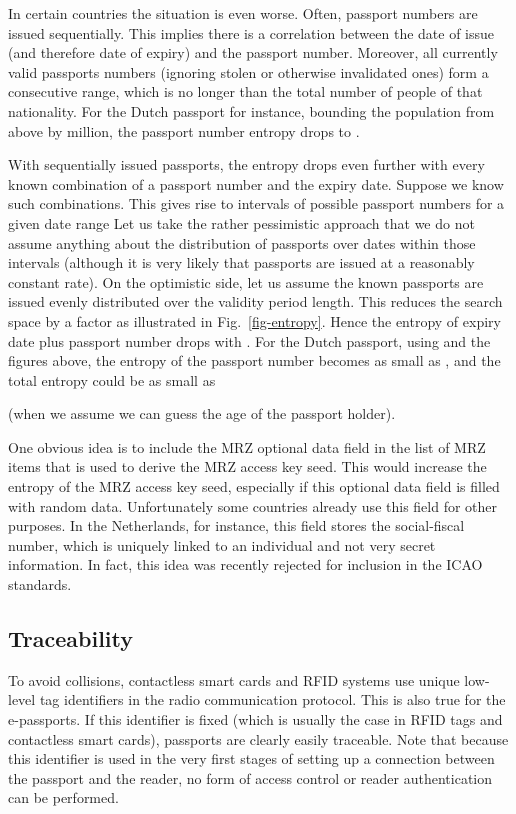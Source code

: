 \documentclass[runningheads,envcountsame,envcountsect,oribibl]{llncs}
\begin{document}
In certain countries the situation is even worse. Often, passport
numbers are issued sequentially. This implies there is a correlation between
the date of issue (and therefore date of expiry) and the passport number. Moreover,
all currently valid passports numbers (ignoring stolen or otherwise invalidated
ones) form a consecutive range, which is no longer than the total number of
people of that nationality. For the Dutch passport for instance,
bounding the population from above by  million, the passport number entropy
drops to .

With sequentially issued passports, the entropy drops even further with every
known combination of a passport number and the expiry date.
Suppose we know  such combinations. This gives rise to
 intervals of possible passport numbers for a given date range
Let us take the rather pessimistic approach that 
 we do not assume anything about the distribution of passports over
dates within those intervals (although it is very likely that passports are
issued at a reasonably constant rate).
On the optimistic side, let us assume the  known passports are
issued evenly distributed over the validity period length.
This reduces the search space by a factor  
as illustrated in Fig.~\ref{fig-entropy}.
Hence the entropy 
of expiry date plus passport number drops with
. 
For the Dutch passport, using  and the figures above, the entropy 
of the passport number becomes as small as , and the total
entropy could be as small as 

(when we assume we can guess the age of the passport holder).

One obvious idea is to include the MRZ optional
data field in the list of MRZ items that is used to derive the MRZ access
key seed. This would increase the entropy of the MRZ access key seed,
especially if this 
optional data field is filled with random data.
Unfortunately some countries 
already use this field for other purposes. In the Netherlands, for instance,
this field stores the social-fiscal number, which is uniquely linked to an
individual and not very secret information.
In fact, this idea was recently rejected for inclusion in the ICAO standards.

\subsection{Traceability} \label{subsec-trace}

To avoid collisions, contactless smart cards and RFID systems 
use unique low-level tag identifiers in the radio communication
protocol. This is also true for the e-passports.
If this identifier is fixed (which is usually the case in RFID tags and
contactless smart cards), passports are clearly easily traceable.
Note that because this identifier is used in the very first stages of setting
up a connection between the passport and the reader, no form of access control
or reader authentication can be performed. 
\end{document}
